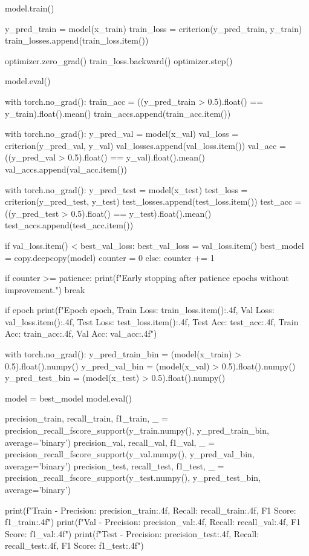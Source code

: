 \documentclass[11pt]{article}
\begin{document}
\begin{python}
    model.train()
    
    
    y_pred_train = model(x_train)
    train_loss = criterion(y_pred_train, y_train)
    train_losses.append(train_loss.item())

    
    optimizer.zero_grad()
    train_loss.backward()
    optimizer.step()

    
    model.eval()
    
    
    with torch.no_grad():
        train_acc = ((y_pred_train > 0.5).float() == y_train).float().mean()
        train_accs.append(train_acc.item())

    
    with torch.no_grad():
        y_pred_val = model(x_val)
        val_loss = criterion(y_pred_val, y_val)
        val_losses.append(val_loss.item())
        val_acc = ((y_pred_val > 0.5).float() == y_val).float().mean()
        val_accs.append(val_acc.item())

    
    with torch.no_grad():
        y_pred_test = model(x_test)
        test_loss = criterion(y_pred_test, y_test)
        test_losses.append(test_loss.item())
        test_acc = ((y_pred_test > 0.5).float() == y_test).float().mean()
        test_accs.append(test_acc.item())

    if val_loss.item() < best_val_loss:
        best_val_loss = val_loss.item()
        best_model = copy.deepcopy(model)
        counter = 0
    else:
        counter += 1

    if counter >= patience:
        print(f"Early stopping after {patience} epochs without improvement.")
        break

    if epoch %
      print(f"Epoch {epoch}, Train Loss: {train_loss.item():.4f}, Val Loss: {val_loss.item():.4f}, Test Loss: {test_loss.item():.4f}, Test Acc: {test_acc:.4f}, Train Acc: {train_acc:.4f}, Val Acc: {val_acc:.4f}")

    

    with torch.no_grad():
      y_pred_train_bin = (model(x_train) > 0.5).float().numpy()
      y_pred_val_bin = (model(x_val) > 0.5).float().numpy()
      y_pred_test_bin = (model(x_test) > 0.5).float().numpy()

model = best_model
model.eval()

precision_train, recall_train, f1_train, _ = precision_recall_fscore_support(y_train.numpy(), y_pred_train_bin, average='binary')
precision_val, recall_val, f1_val, _ = precision_recall_fscore_support(y_val.numpy(), y_pred_val_bin, average='binary')
precision_test, recall_test, f1_test, _ = precision_recall_fscore_support(y_test.numpy(), y_pred_test_bin, average='binary')
        


print(f"Train - Precision: {precision_train:.4f}, Recall: {recall_train:.4f}, F1 Score: {f1_train:.4f}")
print(f"Val - Precision: {precision_val:.4f}, Recall: {recall_val:.4f}, F1 Score: {f1_val:.4f}")
print(f"Test - Precision: {precision_test:.4f}, Recall: {recall_test:.4f}, F1 Score: {f1_test:.4f}")

\end{python}
\end{document}
